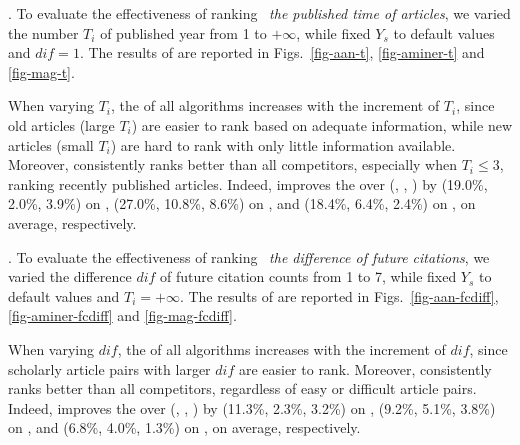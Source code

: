 .
To evaluate the effectiveness of ranking \wrt\ {\em the published time of articles},
we varied the number $T_i$ of published year from 1 to $+\infty$, while fixed $Y_s$ to default values and $dif=1$. The results of \PairAcc are reported in Figs.~\ref{fig-aan-t}, \ref{fig-aminer-t} and \ref{fig-mag-t}.


When varying $T_i$, the \PairAcc of all algorithms increases with the increment of $T_i$, since old articles (large $T_i$) are easier to rank based on adequate information, while new articles (small $T_i$) are hard to rank with only little information available. Moreover, \ensemblerank consistently ranks better than all competitors, especially when $T_i\le3$, \ie ranking recently published articles. Indeed, \ensemblerank improves the \PairAcc over (\pagerank, \futurerank, \hhgrank) by (19.0\%, 2.0\%, 3.9\%) on \aan, (27.0\%, 10.8\%, 8.6\%) on \aminer, and (18.4\%, 6.4\%, 2.4\%) on \magdata, on average, respectively.


.
To evaluate the effectiveness of ranking \wrt\ {\em the difference of future citations},
we varied the difference $dif$ of future citation counts from 1 to 7, while fixed $Y_s$ to default values and $T_i=+\infty$. The results of \PairAcc are reported in Figs.~\ref{fig-aan-fcdiff}, \ref{fig-aminer-fcdiff} and \ref{fig-mag-fcdiff}.

When varying $dif$, the \PairAcc of all algorithms increases with the increment of $dif$, since scholarly article pairs with larger $dif$ are easier to rank. Moreover, \ensemblerank consistently ranks better than all competitors, regardless of easy or difficult article pairs. Indeed, \ensemblerank improves the \PairAcc over (\pagerank, \futurerank, \hhgrank) by (11.3\%, 2.3\%, 3.2\%) on \aan, (9.2\%, 5.1\%, 3.8\%) on \aminer, and (6.8\%, 4.0\%, 1.3\%) on \magdata, on average, respectively.




